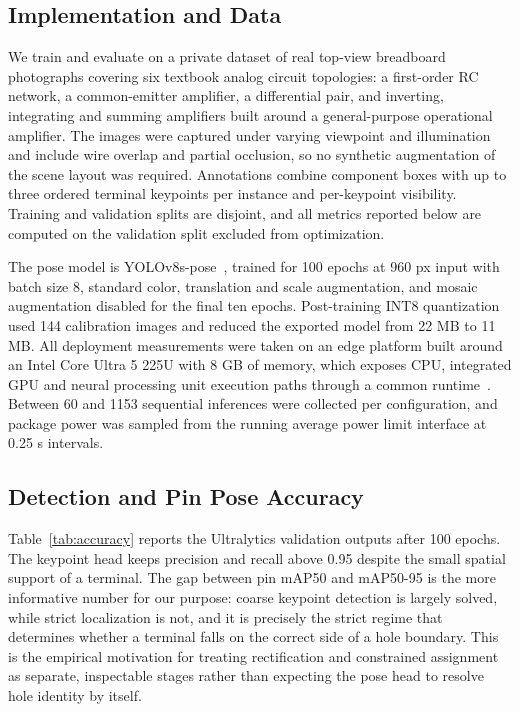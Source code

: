\documentclass[conference]{IEEEtran}
\begin{document}
\subsection{Implementation and Data}

We train and evaluate on a private dataset of real top-view breadboard
photographs covering six textbook analog circuit topologies: a first-order RC network, a
common-emitter amplifier, a differential pair, and inverting, integrating and
summing amplifiers built around a general-purpose operational amplifier. The
images were captured under varying viewpoint and illumination and include wire
overlap and partial occlusion, so no synthetic augmentation of the scene layout
was required. Annotations combine component boxes with up to three ordered
terminal keypoints per instance and per-keypoint visibility. Training and validation splits are disjoint, and all metrics reported below are
computed on the validation split excluded from optimization.

The pose model is YOLOv8s-pose~\cite{yolo}, trained for 100 epochs at 960 px
input with batch size 8, standard color, translation and scale augmentation, and
mosaic augmentation disabled for the final ten epochs. Post-training INT8
quantization used 144 calibration images and reduced the exported model from
22 MB to 11 MB. All deployment measurements were taken on an edge platform built
around an Intel Core Ultra 5 225U with 8 GB of memory, which exposes CPU,
integrated GPU and neural processing unit execution paths through a common
runtime~\cite{intel225u}. Between 60 and 1153 sequential inferences
were collected per configuration, and package power was sampled from the running
average power limit interface at 0.25 s intervals.

\subsection{Detection and Pin Pose Accuracy}

Table~\ref{tab:accuracy} reports the Ultralytics validation outputs after 100
epochs. The keypoint head keeps precision and recall above 0.95 despite the small
spatial support of a terminal. The gap between pin
mAP50 and mAP50-95 is the more informative number for our purpose: coarse
keypoint detection is largely solved, while strict localization is not, and it is
precisely the strict regime that determines whether a terminal falls on the
correct side of a hole boundary. This is the empirical motivation for treating
rectification and constrained assignment as separate, inspectable stages rather
than expecting the pose head to resolve hole identity by itself.
\end{document}
